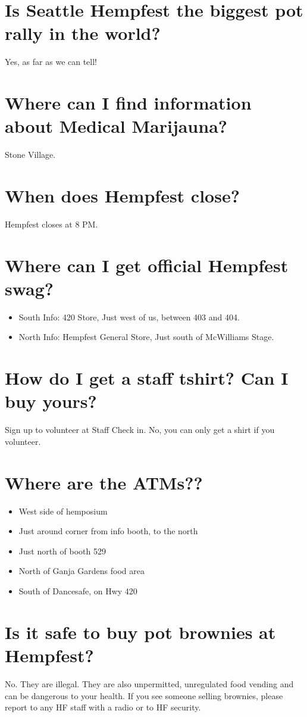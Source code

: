 \section{Is Seattle Hempfest the biggest pot rally in the world?}
Yes, as far as we can tell!

\section{Where can I find information about Medical Marijauna?}
Stone Village.

\section{When does Hempfest close?}
Hempfest closes at 8 PM. 

\section{Where can I get official Hempfest swag?}
\begin{itemize}
	\item South Info: 420 Store, Just west of us, between 403 and 404.
	\item North Info: Hempfest General Store, Just south of McWilliams Stage.
\end{itemize}

\section{How do I get a staff tshirt? Can I buy yours?}
Sign up to volunteer at Staff Check in. No, you can only get a shirt if  you volunteer.

\section{Where are the ATMs??}
\begin{itemize}
	\item West side of hemposium
	\item Just around corner from info booth, to the north
	\item Just north of booth 529
	\item North of Ganja Gardens food area
	\item South of Dancesafe, on Hwy 420
\end{itemize}

\section{Is it safe to buy pot brownies at Hempfest?}
No. They are illegal. They are also unpermitted, unregulated food vending and can be dangerous to your health. If you see someone selling brownies, please report to any HF staff with a radio or to HF security. 

